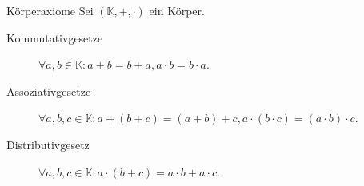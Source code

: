 \documentclass[main.tex]{subfiles}
\begin{document}
\begin{karte}{Körperaxiome}
    Sei \( (\mathbb{K}, +, \cdot ) \) ein Körper.
    \begin{description}
        \item[Kommutativgesetze] \( \forall a,b\in \mathbb{K}: a + b = b + a, a \cdot b = b \cdot a \).
        \item[Assoziativgesetze] \( \forall a,b,c \in \mathbb{K}: 
        a + (b + c) = (a + b) + c, a \cdot (b \cdot c) = (a \cdot b) \cdot c \).
        \item[Distributivgesetz] \( \forall a,b,c\in \mathbb{K}: 
        a \cdot (b + c) = a \cdot b + a \cdot c \).
    \end{description}
\end{karte}
\end{document}
